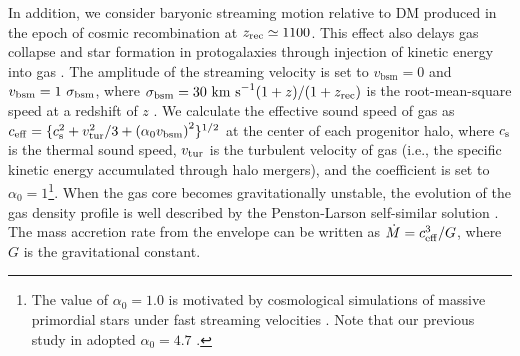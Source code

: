 \documentclass[twocolumn, twocolappendix]{aastex63}
\newcommand{\vbsm}{v_\mathrm{bsm}}
\begin{document}
\begin{CJK*}{UTF8}{gbsn}
In addition, we consider baryonic streaming motion relative to DM produced in the epoch of cosmic recombination at $z_{\rm rec} \simeq 1100$.
This effect also delays gas collapse and star formation in protogalaxies through injection of kinetic energy into gas
\citep[e.g.,][]{2012MNRAS.424.1335F, 2014MNRAS.439.1092T, 2017Sci...357.1375H,2019MNRAS.484.3510S,2021ApJ...917...60L}.
The amplitude of the streaming velocity is set to $\vbsm = 0$ and $\vbsm=1~\sigma_{\rm bsm}$, where $\sigma_{\rm bsm}=30~{\rm km~s}^{-1} (1+z)/(1+z_{\rm rec})$
is the root-mean-square speed at a redshift of $z$ \citep{2010PhRvD..82h3520T}.
We calculate the effective sound speed of gas as $c_{\rm eff} = \{c_{\rm s}^2+v_{\rm tur}^2/3+\left(\alpha_0 \vbsm \right)^2 \}^{1/2}$ at the center of each progenitor halo,
where $c_{\rm s}$ is the thermal sound speed, $v_{\rm tur}$ is the turbulent velocity of gas (i.e., the specific kinetic energy accumulated through halo mergers), and
the coefficient is set to $\alpha_0=1$\footnote[1]{The value of $\alpha_0=1.0$ is motivated by cosmological simulations of massive primordial stars
under fast streaming velocities \citep{2017Sci...357.1375H,2019MNRAS.484.3510S}.
Note that our previous study in \citet{2021ApJ...917...60L} adopted $\alpha_0=4.7$ \citep{2018ApJ...855...17H}.}.
%
When the gas core becomes gravitationally unstable, the evolution of the gas density profile is well described by 
the Penston-Larson self-similar solution \citep{1969MNRAS.144..425P,1969MNRAS.145..271L}. 
The mass accretion rate from the envelope can be written as $\dot{M}=c_{\rm eff}^3/G$,
where $G$ is the gravitational constant.




\end{CJK*}
\end{document}
